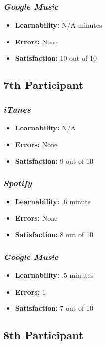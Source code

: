 \documentclass{article}
\begin{document}
\begin{multicols}{2}
\subsubsection{\it Google Music}
\begin{itemize}
\item {\bf Learnability:} N/A minutes
	\item {\bf Errors:} None
	\item {\bf Satisfaction:} 10 out of 10 
\end{itemize}

\subsection{7th Participant}

\subsubsection{\it iTunes}
\begin{itemize}
	\item {\bf Learnability:} N/A
	\item {\bf Errors:}  None
	\item {\bf Satisfaction:} 9 out of 10 
\end{itemize}

\subsubsection{\it Spotify}
\begin{itemize}
	\item {\bf Learnability:}  .6 minute
	\item {\bf Errors:} None
	\item {\bf Satisfaction:} 8 out of 10 
\end{itemize}

\subsubsection{\it Google Music}
\begin{itemize}
\item {\bf Learnability:} .5 minutes
	\item {\bf Errors:} 1
	\item {\bf Satisfaction:} 7 out of 10 
\end{itemize}

\subsection{8th Participant}


\end{multicols}
\end{document}
